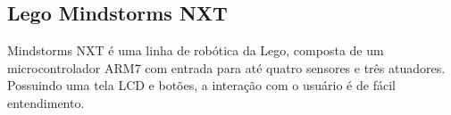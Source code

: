 \subsection{Lego Mindstorms NXT} %
\label{sub:kit_mindstorm}

Mindstorms NXT é uma linha de robótica da Lego, composta de um microcontrolador ARM7 com entrada para até quatro sensores e três atuadores. Possuindo uma tela LCD e botões, a interação com o usuário é de fácil entendimento.

